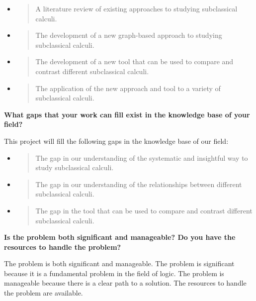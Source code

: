 \begin{itemize}
\item
  \begin{quote}
  A literature review of existing approaches to studying subclassical
  calculi.
  \end{quote}
\item
  \begin{quote}
  The development of a new graph-based approach to studying subclassical
  calculi.
  \end{quote}
\item
  \begin{quote}
  The development of a new tool that can be used to compare and contrast
  different subclassical calculi.
  \end{quote}
\item
  \begin{quote}
  The application of the new approach and tool to a variety of
  subclassical calculi.
  \end{quote}
\end{itemize}

\textbf{What gaps that your work can fill exist in the knowledge base of
your field?}

This project will fill the following gaps in the knowledge base of our
field:

\begin{itemize}
\item
  \begin{quote}
  The gap in our understanding of the systematic and insightful way to
  study subclassical calculi.
  \end{quote}
\item
  \begin{quote}
  The gap in our understanding of the relationships between different
  subclassical calculi.
  \end{quote}
\item
  \begin{quote}
  The gap in the tool that can be used to compare and contrast different
  subclassical calculi.
  \end{quote}
\end{itemize}

\textbf{Is the problem both significant and manageable? Do you have the
resources to handle the problem?}

The problem is both significant and manageable. The problem is
significant because it is a fundamental problem in the field of logic.
The problem is manageable because there is a clear path to a solution.
The resources to handle the problem are available.

